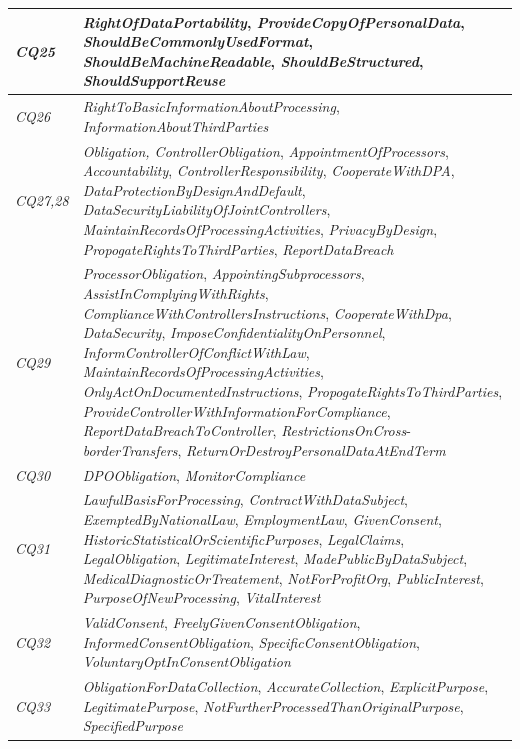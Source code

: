 \begin{center}
\begin{tabularx}{\textwidth}{|l|X|}
\textit{CQ25} & \textit{RightOfDataPortability}, \textit{ProvideCopyOfPersonalData}, \textit{ShouldBeCommonlyUsedFormat}, \textit{ShouldBeMachineReadable}, \textit{ShouldBeStructured}, \textit{ShouldSupportReuse}  \\ \hline
\textit{CQ26} & \textit{RightToBasicInformationAboutProcessing}, \textit{InformationAboutThirdParties}  \\ \hline
\textit{CQ27,28} & \textit{Obligation, ControllerObligation}, \textit{AppointmentOfProcessors}, \textit{Accountability}, \textit{ControllerResponsibility}, \textit{CooperateWithDPA}, \textit{DataProtectionByDesignAndDefault}, \textit{DataSecurityLiabilityOfJointControllers}, \textit{MaintainRecordsOfProcessingActivities}, \textit{PrivacyByDesign}, \textit{PropogateRightsToThirdParties}, \textit{ReportDataBreach} \\ \hline
\textit{CQ29} & \textit{ProcessorObligation}, \textit{AppointingSubprocessors}, \textit{AssistInComplyingWithRights}, \textit{ComplianceWithControllersInstructions}, \textit{CooperateWithDpa}, \textit{DataSecurity}, \textit{ImposeConfidentialityOnPersonnel}, \textit{InformControllerOfConflictWithLaw}, \textit{MaintainRecordsOfProcessingActivities}, \textit{OnlyActOnDocumentedInstructions}, \textit{PropogateRightsToThirdParties}, \textit{ProvideControllerWithInformationForCompliance}, \textit{ReportDataBreachToController}, \textit{RestrictionsOnCross}-\textit{borderTransfers}, \textit{ReturnOrDestroyPersonalDataAtEndTerm} \\ \hline
\textit{CQ30} & \textit{DPOObligation}, \textit{MonitorCompliance} \\ \hline
\textit{CQ31} & \textit{LawfulBasisForProcessing}, \textit{ContractWithDataSubject}, \textit{ExemptedByNationalLaw}, \textit{EmploymentLaw}, \textit{GivenConsent}, \textit{HistoricStatisticalOrScientificPurposes}, \textit{LegalClaims}, \textit{LegalObligation}, \textit{LegitimateInterest}, \textit{MadePublicByDataSubject}, \textit{MedicalDiagnosticOrTreatement}, \textit{NotForProfitOrg}, \textit{PublicInterest}, \textit{PurposeOfNewProcessing}, \textit{VitalInterest} \\ \hline
\textit{CQ32} & \textit{ValidConsent}, \textit{FreelyGivenConsentObligation}, \textit{InformedConsentObligation}, \textit{SpecificConsentObligation}, \textit{VoluntaryOptInConsentObligation}  \\ \hline
\textit{CQ33} & \textit{ObligationForDataCollection}, \textit{AccurateCollection}, \textit{ExplicitPurpose}, \textit{LegitimatePurpose}, \textit{NotFurtherProcessedThanOriginalPurpose}, \textit{SpecifiedPurpose} \\ \hline

\end{tabularx}
\end{center}
